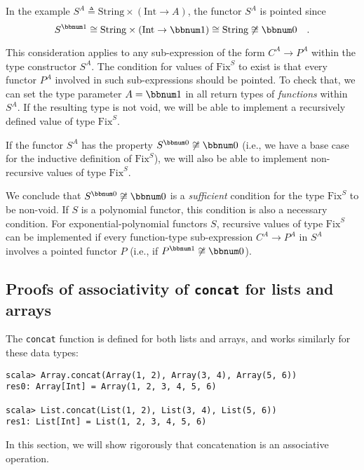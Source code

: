 In the example $S^{A}\triangleq\text{String}\times(\text{Int}\rightarrow A)$,
the functor $S^{A}$ is pointed since 
\[
S^{\bbnum 1}\cong\text{String}\times(\text{Int}\rightarrow\bbnum 1)\cong\text{String}\not\cong\bbnum 0\quad.
\]

This consideration applies to any sub-expression of the form $C^{A}\rightarrow P^{A}$
within the type constructor $S^{A}$. The condition for values of
$\text{Fix}^{S}$ to exist is that every functor $P^{A}$ involved
in such sub-expressions should be pointed. To check that, we can set
the type parameter $A=\bbnum 1$ in all return types of \emph{functions}
within $S^{A}$. If the resulting type is not void, we will be able
to implement a recursively defined value of type $\text{Fix}^{S}$.

If the functor $S^{A}$ has the property $S^{\bbnum 0}\not\cong\bbnum 0$
(i.e., we have a base case for the inductive definition of $\text{Fix}^{S}$),
we will also be able to implement non-recursive values of type $\text{Fix}^{S}$.

We conclude that $S^{\bbnum 0}\not\cong\bbnum 0$ is a \emph{sufficient}
condition for the type $\text{Fix}^{S}$ to be non-void. If $S$ is
a polynomial functor, this condition is also a necessary condition.
For exponential-polynomial functors $S$, recursive values of type
$\text{Fix}^{S}$ can be implemented if every function-type sub-expression
$C^{A}\rightarrow P^{A}$ in $S^{A}$ involves a pointed functor $P$
(i.e., if $P^{\bbnum 1}\not\cong\bbnum 0$).

\subsection{Proofs of associativity of \texttt{concat} for lists and arrays\label{subsec:Proofs-for-associativity-law-lists-and-arrays-concat}}

The \lstinline!concat! function is defined for both lists and arrays,
and works similarly for these data types:
\begin{lstlisting}
scala> Array.concat(Array(1, 2), Array(3, 4), Array(5, 6))
res0: Array[Int] = Array(1, 2, 3, 4, 5, 6)

scala> List.concat(List(1, 2), List(3, 4), List(5, 6))
res1: List[Int] = List(1, 2, 3, 4, 5, 6)
\end{lstlisting}
In this section, we will show rigorously that concatenation is an
associative operation.

